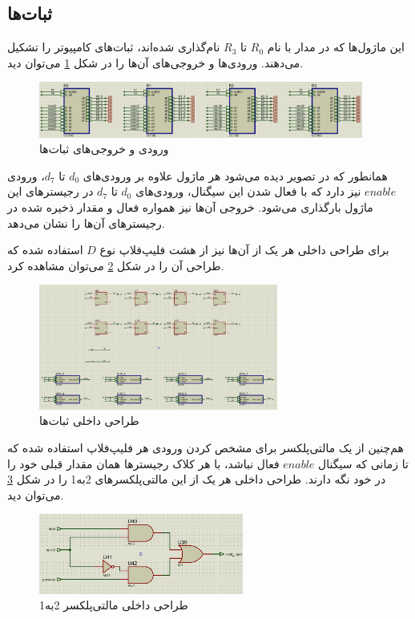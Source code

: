 \documentclass[12pt,onecolumn,a4paper,fleqn]{article}
\begin{document}
	\subsection{ثبات‌ها}
	این ماژول‌ها که در مدار با نام $R_0$ تا $R_3$ نام‌گذاری شده‌اند، ثبات‌های کامپیوتر را تشکیل می‌دهند. ورودی‌ها و خروجی‌های آن‌ها را در شکل \ref{fig:regs} می‌توان دید.
	\begin{figure}[H]
		\centering
		\includegraphics[width=0.95\textwidth]{source/regs.png}
		\caption{ورودی و خروجی‌های ثبات‌ها}
		\label{fig:regs}
	\end{figure}
	همانطور که در تصویر دیده می‌شود هر ماژول علاوه بر ورودی‌های $d_0$ تا $d_7$، ورودی $enable$ نیز دارد که با فعال شدن این سیگنال، ورودی‌های $d_0$ تا $d_7$ در رجیستر‌های این ماژول بارگذاری می‌شود. خروجی آن‌ها نیز همواره فعال و مقدار ذخیره شده در رجیستر‌های آن‌ها را نشان می‌دهد.
	
	برای طراحی داخلی هر یک از آن‌ها نیز از هشت فلیپ‌فلاپ نوع $D$ استفاده شده که طراحی آن را در شکل \ref{fig:regs-in} می‌توان مشاهده کرد.
	\begin{figure}[H]
		\centering
		\includegraphics[width=0.7\textwidth]{source/regs-in.png}
		\caption{طراحی داخلی ثبات‌ها}
		\label{fig:regs-in}
	\end{figure}
	\noindent
	هم‌چنین از یک مالتی‌پلکسر برای مشخص کردن ورودی هر فلیپ‌فلاپ استفاده شده که تا زمانی که سیگنال $enable$ فعال نباشد، با هر کلاک رجیسترها همان مقدار قبلی خود را در خود نگه دارند. طراحی داخلی هر یک از این مالتی‌پلکسرهای 2به1 را در شکل \ref{fig:regs-mux} می‌توان دید.
	\begin{figure}[H]
		\centering
		\includegraphics[width=0.6\textwidth]{source/regs-mux-in.png}
		\caption{طراحی داخلی مالتی‌پلکسر 2به1}
		\label{fig:regs-mux}
	\end{figure}
\end{document}

